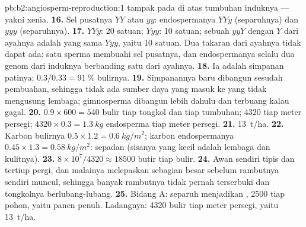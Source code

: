 \begin{solution}{pb:b2:angiosperm-reproduction:1}
tampak pada  di atas tumbuhan induknya --- yakni xenia.
\textbf{16.} Sel pusatnya $YY$ atau $yy$: endospermanya $YYy$
(separuhnya) dan $yyy$ (separuhnya).
\textbf{17.} $YYy$: 20 satuan; $Yyy$: 10 satuan; sebuah $yyY$ dengan
$Y$ dari ayahnya adalah  yang sama $Yyy$, yaitu 10 satuan. Dua
takaran dari ayahnya tidak dapat ada: satu sperma membuahi sel
pusatnya, dan endospermanya selalu dua genom dari induknya berbanding
satu dari ayahnya.
\textbf{18.} Ia adalah simpanan patinya; $0.3/0.33 = \qty{91}{\%}$
bulirnya.
\textbf{19.} Simpanannya baru dibangun sesudah pembuahan, sehingga tidak
ada sumber daya yang masuk ke  yang tidak mengusung lembaga;
 gimnosperma dibangun lebih dahulu dan terbuang kalau
 gagal.
\textbf{20.} $0.9\times 600 = 540$ bulir tiap tongkol dan tiap
tumbuhan; $4320$ tiap meter persegi; $4320\times 0.3 = \qty{1.3}{kg}$
endosperma tiap meter persegi.
\textbf{21.} \qty{13}{t/ha}.
\textbf{22.} Karbon bulirnya $0.5\times 1.2 = \qty{0.6}{kg/m^2}$;
karbon endospermanya $0.45\times 1.3 = \qty{0.58}{kg/m^2}$: sepadan
(sisanya yang kecil adalah lembaga dan kulitnya).
\textbf{23.} $8\times 10^{7}/4320 \approx \num{18500}$ butir tiap
bulir.
\textbf{24.} Awan  sendiri tipis dan tertiup pergi, dan
malainya melepaskan  sebagian besar sebelum rambutnya
sendiri muncul, sehingga banyak rambutnya tidak pernah terserbuki dan
tongkolnya berlubang-lubang.
\textbf{25.} Bidang A: separuh  menjadikan , 2500 tiap
pohon, yaitu panen penuh. Ladangnya: 4320 bulir tiap meter persegi,
yaitu \qty{13}{t/ha}.
\end{solution}
